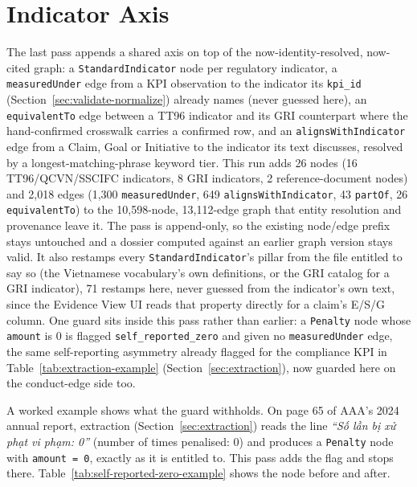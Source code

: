 \documentclass[fontsize=12pt,oneside,headings=small]{scrreprt}
\begin{document}
\section{Indicator Axis}
\label{sec:indicator-axis}

The last pass appends a shared axis on top of the now-identity-resolved, now-cited graph: a \texttt{StandardIndicator} node per regulatory indicator, a \texttt{measuredUnder} edge from a KPI observation to the indicator its \texttt{kpi\_id} (Section~\ref{sec:validate-normalize}) already names (never guessed here), an \texttt{equivalentTo} edge between a TT96 indicator and its GRI counterpart where the hand-confirmed crosswalk carries a confirmed row, and an \texttt{alignsWithIndicator} edge from a Claim, Goal or Initiative to the indicator its text discusses, resolved by a longest-matching-phrase keyword tier. This run adds 26 nodes (16 TT96/QCVN/SSCIFC indicators, 8 GRI indicators, 2 reference-document nodes) and 2{,}018 edges (1{,}300 \texttt{measuredUnder}, 649 \texttt{alignsWithIndicator}, 43 \texttt{partOf}, 26 \texttt{equivalentTo}) to the 10{,}598-node, 13{,}112-edge graph that entity resolution and provenance leave it. The pass is append-only, so the existing node/edge prefix stays untouched and a dossier computed against an earlier graph version stays valid. It also restamps every \texttt{StandardIndicator}'s pillar from the file entitled to say so (the Vietnamese vocabulary's own definitions, or the GRI catalog for a GRI indicator), 71 restamps here, never guessed from the indicator's own text, since the Evidence View UI reads that property directly for a claim's E/S/G column. One guard sits inside this pass rather than earlier: a \texttt{Penalty} node whose \texttt{amount} is 0 is flagged \texttt{self\_reported\_zero} and given no \texttt{measuredUnder} edge, the same self-reporting asymmetry already flagged for the compliance KPI in Table~\ref{tab:extraction-example} (Section~\ref{sec:extraction}), now guarded here on the conduct-edge side too.

A worked example shows what the guard withholds. On page 65 of AAA's 2024 annual report, extraction (Section~\ref{sec:extraction}) reads the line \emph{``Số lần bị xử phạt vi phạm: 0''} (number of times penalised: 0) and produces a \texttt{Penalty} node with \texttt{amount = 0}, exactly as it is entitled to. This pass adds the flag and stops there. Table~\ref{tab:self-reported-zero-example} shows the node before and after.
\end{document}
